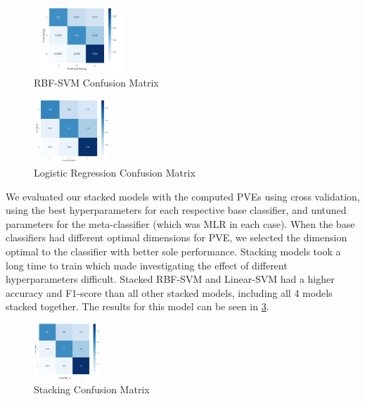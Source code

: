 \documentclass[11pt]{article}
\begin{document}
\begin{figure}
	\centering
	\includegraphics[width = 0.3\textwidth]{fig-rbf-cm.png}
	\caption{RBF-SVM Confusion Matrix}
	\label{fig:rbf-cm}
\end{figure}

\begin{figure}
	\centering
	\includegraphics[width = 0.25\textwidth]{fig-lr-cm.png}
	\caption{Logistic Regression Confusion Matrix}
	\label{fig:lr-cm}
\end{figure}


We evaluated our stacked models with the computed PVEs using cross validation, using the best hyperparameters for each respective base classifier, and untuned parameters for the meta-classifier (which was MLR in each case). When the base classifiers had different optimal dimensions for PVE, we selected the dimension optimal to the classifier with better sole performance. Stacking models took a long time to train which made investigating the effect of different hyperparameters difficult. Stacked RBF-SVM and Linear-SVM had a higher accuracy and F1-score than all other stacked models, including all 4 models stacked together. The results for this model can be seen in \ref{fig:stack-cm}.
\begin{figure}
	\centering
	\includegraphics[width = 0.22\textwidth]{fig-stack-cm.png}
	\caption{Stacking Confusion Matrix}
	\label{fig:stack-cm}
\end{figure}
\end{document}
